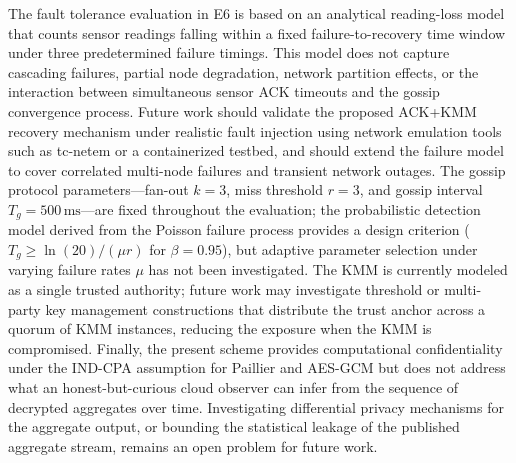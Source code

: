 \documentclass[conference]{IEEEtran}
\begin{document}
    The fault tolerance evaluation in E6 is based on an analytical reading-loss model that counts sensor readings falling within a fixed failure-to-recovery time window under three predetermined failure timings. This model does not capture cascading failures, partial node degradation, network partition effects, or the interaction between simultaneous sensor ACK timeouts and the gossip convergence process. Future work should validate the proposed ACK+KMM recovery mechanism under realistic fault injection using network emulation tools such as tc-netem or a containerized testbed, and should extend the failure model to cover correlated multi-node failures and transient network outages. The gossip protocol parameters---fan-out $k{=}3$, miss threshold $r{=}3$, and gossip interval $T_g{=}500\,\text{ms}$---are fixed throughout the evaluation; the probabilistic detection model derived from the Poisson failure process provides a design criterion ($T_g \geq \ln(20)/(\mu r)$ for $\beta=0.95$), but adaptive parameter selection under varying failure rates $\mu$ has not been investigated. The KMM is currently modeled as a single trusted authority; future work may investigate threshold or multi-party key management constructions that distribute the trust anchor across a quorum of KMM instances, reducing the exposure when the KMM is compromised. Finally, the present scheme provides computational confidentiality under the IND-CPA assumption for Paillier and AES-GCM but does not address what an honest-but-curious cloud observer can infer from the sequence of decrypted aggregates over time. Investigating differential privacy mechanisms for the aggregate output, or bounding the statistical leakage of the published aggregate stream, remains an open problem for future work.

    
    

    
\end{document}
